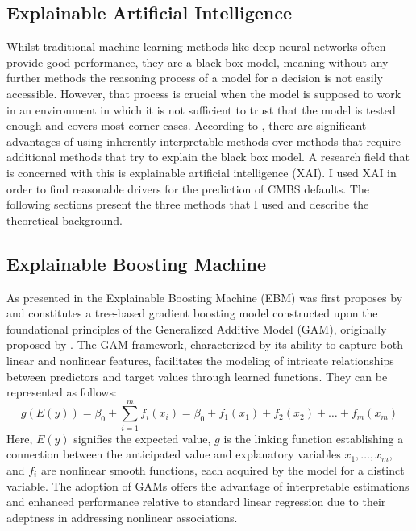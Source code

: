 \documentclass{article}
\begin{document}
\subsection{Explainable Artificial Intelligence}
Whilst traditional machine learning methods like deep neural networks often provide good performance, they are a black-box model, meaning without any further methods the reasoning process of a model for a decision is not easily accessible.
However, that process is crucial when the model is supposed to work in an environment in which it is not sufficient to trust that the model is tested enough and covers most corner cases.
According to \cite{Rudin2019}, there are significant advantages of using inherently interpretable methods over methods that require additional methods that try to explain the black box model.
A research field that is concerned with this is explainable artificial intelligence (XAI).
I used XAI in order to find reasonable drivers for the prediction of CMBS defaults.
The following sections present the three methods that I used and describe the theoretical background.

\subsection{Explainable Boosting Machine}
As presented in \cite{nazemi2022interpretable} the Explainable Boosting Machine (EBM) was first proposes by \cite{nori2019interpretable} and constitutes a tree-based gradient boosting model constructed upon the foundational principles of the Generalized Additive Model (GAM), originally proposed by \cite{hastie1986generalized}. The GAM framework, characterized by its ability to capture both linear and nonlinear features, facilitates the modeling of intricate relationships between predictors and target values through learned functions. They can be represented as follows:
\begin{equation}
g(E(y)) = \beta_0 + \sum_{i=1}^{m} f_i(x_i) = \beta_0 + f_1(x_1) + f_2(x_2) + \dots + f_m(x_m)
\end{equation}
Here, \(E(y)\) signifies the expected value, \(g\) is the linking function establishing a connection between the anticipated value and explanatory variables \(x_1, \ldots, x_m\), and \(f_i\) are nonlinear smooth functions, each acquired by the model for a distinct variable. The adoption of GAMs offers the advantage of interpretable estimations and enhanced performance relative to standard linear regression due to their adeptness in addressing nonlinear associations. \cite{nazemi2022interpretable}
\end{document}
